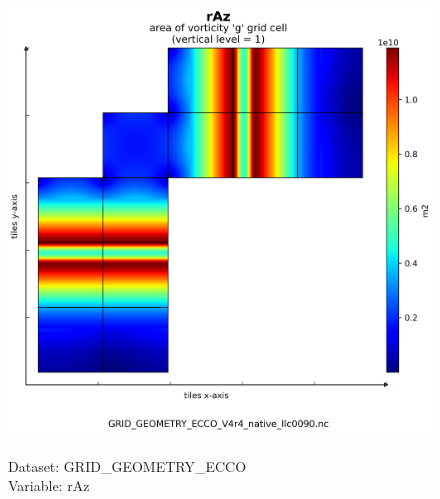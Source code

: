 \begin{figure}[H]
\centering
\includegraphics[scale=0.5]{../images/plots/native_plots_coords/Geometry_Parameters_for_the_Lat-Lon-Cap_90_(llc90)_Native_Model_Grid_(Version_4_Release_4)/rAz.png}
\caption{\\Dataset: GRID\_GEOMETRY\_ECCO\\Variable: rAz}
\label{tab:table-GRID_GEOMETRY_ECCO_rAz-Plot}
\end{figure}
\pagebreak
